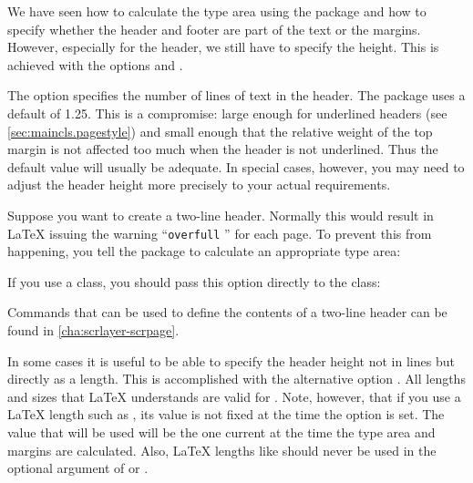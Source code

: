 \begin{Declaration}
\end{Declaration}%
%
We have seen how to calculate the type area using the 
package and how to specify whether the header and footer are part of the text
or the margins. However, especially for the header, we still have to specify
the height. This is achieved with the options  and
.

The  option specifies the
number of lines of text in the header. The  package uses a
default of 1.25. This is a compromise: large enough for underlined headers
(see \autoref{sec:maincls.pagestyle}) and small enough that the relative
weight of the top margin is not affected too much when the header is not
underlined. Thus the default value will usually be adequate. In special cases,
however, you may need to adjust the header height more precisely to your
actual requirements.

\begin{Example}
  Suppose you want to create a two-line header. Normally this would result in
  {\LaTeX} issuing the warning ``\texttt{overfull} '' for each
  page. To prevent this from happening, you tell the 
  package to calculate an appropriate type area:
  If you use a {\KOMAScript} class, you should pass this option directly to
  the class:
  Commands that can be used to define the contents of a two-line header
  can be found in \autoref{cha:scrlayer-scrpage}.
\end{Example}

In some cases it is useful to be able to specify the header height not in
lines but directly as a length. This is accomplished with the alternative
option . All lengths and
sizes that \LaTeX{} understands are valid for .
Note, however, that if you use a \LaTeX{} length such as
, its value is not fixed at the time the option is set.
The value that will be used will be the one current at the time the type area
and margins are calculated. Also, \LaTeX{} lengths like
 should  never be used in the optional argument of
 or .

